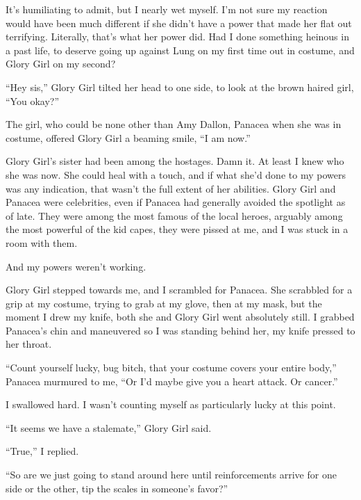 It's humiliating to admit, but I nearly wet myself.  I'm not sure my reaction would have been much different if she didn't have a power that made her flat out terrifying.  Literally, that's what her power did.  Had I done something heinous in a past life, to deserve going up against Lung on my first time out in costume, and Glory Girl on my second?



``Hey sis,'' Glory Girl tilted her head to one side, to look at the brown haired girl, ``You okay?''



The girl, who could be none other than Amy Dallon, Panacea when she was in costume, offered Glory Girl a beaming smile, ``I am now.''



Glory Girl's sister had been among the hostages.  Damn it.  At least I knew who she was now.  She could heal with a touch, and if what she'd done to my powers was any indication, that wasn't the full extent of her abilities.  Glory Girl and Panacea were celebrities, even if Panacea had generally avoided the spotlight as of late.  They were among the most famous of the local heroes, arguably among the most powerful of the kid capes, they were pissed at me, and I was stuck in a room with them.



And my powers weren't working.



Glory Girl stepped towards me, and I scrambled for Panacea.  She scrabbled for a grip at my costume, trying to grab at my glove, then at my mask,  but the moment I drew my knife, both she and Glory Girl went absolutely still.  I grabbed Panacea's chin and maneuvered so I was standing behind her, my knife pressed to her throat.



``Count yourself lucky, bug bitch, that your costume covers your entire body,'' Panacea murmured to me, ``Or I'd maybe give you a heart attack.  Or cancer.''



I swallowed hard.  I wasn't counting myself as particularly lucky at this point.



``It seems we have a stalemate,'' Glory Girl said.



``True,'' I replied.



``So are we just going to stand around here until reinforcements arrive for one side or the other, tip the scales in someone's favor?''



